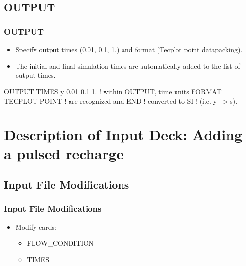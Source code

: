 \documentclass{beamer}
\newcommand\redcomment[1]{{{\color{red} #1}}}
\newcommand\bluecomment[1]{{{\color{blue} #1}}}
\newcommand\greencomment[1]{{{\color{green} #1}}}
\begin{document}
\subsection{OUTPUT}

\begin{frame}[fragile]\frametitle{OUTPUT}

\begin{itemize}
\item Specify output times (0.01, 0.1, 1.) and format (Tecplot point datapacking).
\item The initial and final simulation times are automatically added to the list of output times.
\end{itemize}


\begin{semiverbatim}

OUTPUT
  TIMES \redcomment{y} 0.01 0.1 1.     \bluecomment{! within OUTPUT, time units}
  FORMAT TECPLOT POINT    \bluecomment{!   are recognized and}
END                       \bluecomment{!   converted to SI}
                          \bluecomment{!   (i.e. \redcomment{y} --> \greencomment{s}).}
\end{semiverbatim}

\end{frame}

\section{Description of Input Deck: Adding a pulsed recharge}

\subsection{Input File Modifications}

\begin{frame}[fragile]\frametitle{Input File Modifications}

\begin{itemize}
\item Modify cards:
  \begin{itemize}
    \item FLOW\_CONDITION
    \item TIMES
   \end{itemize}
\end{itemize}

\end{frame}
\end{document}
